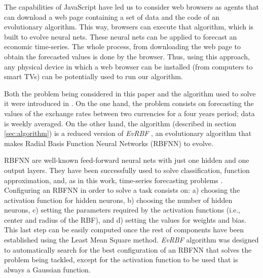 \documentclass{article}
\begin{document}
The capabilities of JavaScript have led us to consider web browsers as agents that can download a web page containing a set
of data and the code of an evolutionary algorithm. This way, browsers can execute that algorithm, which is built to evolve neural nets. These neural nets can be applied to forecast an economic time-series. The whole process, from downloading the web page to obtain the forecasted values is done by the browser. Thus, using
this approach, any physical device in which a web browser can be installed (from
computers to smart TVs) can be potentially used to run our algorithm.

Both the problem being considered in this paper and the algorithm used
to solve it were introduced in \cite{rivas03:EvRBF}. On the one hand,
the problem consists on forecasting the values of the exchange rates
between two currencies for a four years period; data is weekly averaged. %
On the other hand, the algorithm (described in
section \ref{sec:algorithm}) is a reduced version of {\em EvRBF}
\cite{rivas03:EvRBF}, an evolutionary algorithm that makes Radial Basis
Function Neural Networks (RBFNN) to evolve.

RBFNN are well-known feed-forward neural nets with just one hidden and
one output layers. %
They have been successfully used to solve classification, function
approximation, and, as in this work, time-series forecasting problems
\cite{Broomhead88,Keogh03,Whitehead}.
Configuring an RBFNN in order to solve a task consists on: a) choosing the activation function for hidden neurons, b) choosing the number of hidden neurons, c) setting the parameters required by the activation functions (i.e., center and radius of the RBF), and d) setting the values for weights and bias. This last step can be easily computed once the rest of components have been established using the Least Mean Square method. {\em EvRBF} algorithm was designed to automatically search for the best configuration of an RBFNN that solves the problem being tackled, except for the activation function to be used that is always a Gaussian function.
\end{document}
